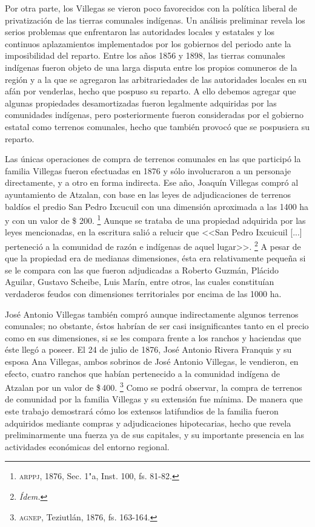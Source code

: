 \documentclass[14pt,twoside,final]{extbook} %
\let\oldfootnote\footnote
\renewcommand\footnote[1]{%
\oldfootnote{\hspace{1mm}#1}}
\begin{document}
Por otra parte, los Villegas se vieron poco favorecidos con la política liberal de privatización de las tierras comunales indígenas. Un análisis preliminar revela los serios problemas que enfrentaron las autoridades locales y estatales y los continuos aplazamientos implementados por los gobiernos del periodo ante la imposibilidad del reparto. Entre los años 1856 y 1898, las tierras comunales indígenas fueron objeto de una larga disputa entre los propios comuneros de la región y a la que se agregaron las arbitrariedades de las autoridades locales en su afán por venderlas, hecho que pospuso su reparto. A ello debemos agregar que algunas propiedades desamortizadas fueron legalmente adquiridas por las comunidades indígenas, pero posteriormente fueron consideradas por el gobierno estatal como terrenos comunales, hecho que también provocó que se pospusiera su reparto.

Las únicas operaciones de compra de terrenos comunales en las que participó la familia Villegas fueron efectuadas en 1876 y sólo involucraron a un personaje directamente, y a otro en forma indirecta. Ese año, Joaquín Villegas compró al ayuntamiento de Atzalan, con base en las leyes de adjudicaciones de terrenos baldíos el predio San Pedro Ixcucuil con una dimensión aproximada a las 1400 ha y con un valor de \$ 200.\footnote{\textsc{arppj}, 1876, Sec. 1"a, Inst. 100, fs. 81-82.} Aunque se trataba de una propiedad adquirida por las leyes mencionadas, en la escritura salió a relucir que <<San Pedro Ixcuicuil [...] perteneció a la comunidad de razón e indígenas de aquel lugar>>.\footnote{\em Ídem.} A pesar de que la propiedad era de medianas dimensiones, ésta era relativamente pequeña si se le compara con las que fueron adjudicadas a Roberto Guzmán, Plácido Aguilar, Gustavo Scheibe, Luis Marín, entre otros, las cuales constituían verdaderos feudos con dimensiones territoriales por encima de las 1000 ha.

José Antonio Villegas también compró aunque indirectamente algunos terrenos comunales; no obstante, éstos habrían de ser casi insignificantes tanto en el precio como en sus dimensiones, si se les compara frente a los ranchos y haciendas que éste llegó a poseer. El 24 de julio de 1876, José Antonio Rivera Franquis y su esposa Ana Villegas, ambos sobrinos de José Antonio Villegas, le vendieron, en efecto, cuatro ranchos que habían pertenecido a la comunidad indígena de Atzalan por un valor de \$\,400.\footnote{\textsc{agnep}, Teziutlán, 1876, fs. 163-164.} Como se podrá observar, la compra de terrenos de comunidad por la familia Villegas y su extensión fue mínima. De manera que este trabajo demostrará cómo los extensos latifundios de la familia fueron adquiridos mediante compras y adjudicaciones hipotecarias, hecho que revela preliminarmente una fuerza ya de sus capitales, y su importante presencia en las actividades económicas del entorno regional.
\end{document}
